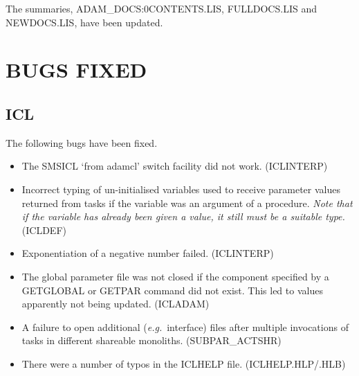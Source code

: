 The summaries, ADAM\_DOCS:0CONTENTS.LIS, FULLDOCS.LIS and NEWDOCS.LIS, have 
been updated. 

\section{BUGS FIXED}
\subsection{ICL}
The following bugs have been fixed.
\begin{itemize}
\item The SMSICL `from adamcl' switch facility did not work. (ICLINTERP)
\item Incorrect typing of un-initialised variables used to receive parameter 
values returned from tasks if the variable was an argument of a procedure.
{\em Note that if the variable has already been given a value, it 
still must be a suitable type.}
(ICLDEF)
\item Exponentiation of a negative number failed. (ICLINTERP)
\item The global parameter file was not closed if the component specified
by a GETGLOBAL or GETPAR command did not exist. This led to values
apparently not being updated. (ICLADAM)
\item A failure to open additional ({\em e.g.}\ interface) files after
multiple invocations of tasks in different shareable monoliths.
(SUBPAR\_ACTSHR)
\item There were a number of typos in the ICLHELP file. (ICLHELP.HLP/.HLB)
\end{itemize}

